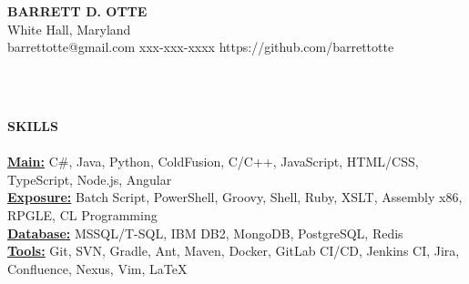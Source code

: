 \documentclass{article}
\newcommand{\lineunder}{
	\vspace*{-4pt}\\ 
	\hspace*{-18pt}\hrulefill \\
}
\newcommand{\header}[1]{
	{\hspace*{-15pt}\vspace*{6pt}\textsc{#1}}\vspace*{-6pt}\lineunder
}
\newcommand{\contact}[5]{
	\vspace*{-8pt}
	\begin{center}
		{\Large \textbf \scshape {#1}}\\
		\normalsize #2\\
		\normalsize #3 \hspace*{20pt} 
		\normalsize #4 \hspace*{20pt}
		\normalsize #5
		\lineunder
	\end{center}
	\vspace*{-8pt}
}
\newcommand{\resumeheader}[1]{
	\vspace*{5pt}
	\header{\textbf{#1}}
}
\begin{document}
	\normalsize
	\smallskip
	\vspace*{-44pt}

	\contact
		{\bfseries BARRETT D. OTTE}
		{White Hall, Maryland}
		{barrettotte@gmail.com}
		{xxx-xxx-xxxx}
		{https://github.com/barrettotte}
	
	\resumeheader{SKILLS}
		\textbf{\underline{Main:}} 
			C\#, Java, Python, ColdFusion, C/C++, JavaScript, HTML/CSS, TypeScript, Node.js, Angular \\ \vspace*{4pt}
		\textbf{\underline{Exposure:}} 
			Batch Script, PowerShell, Groovy, Shell, Ruby, XSLT, Assembly x86, RPGLE, CL Programming \\ \vspace*{4pt}
		\textbf{\underline{Database:}} 
			MSSQL/T-SQL, IBM DB2, MongoDB, PostgreSQL, Redis \\ \vspace*{4pt}
		\textbf{\underline{Tools:}} 
			Git, SVN, Gradle, Ant, Maven, Docker, GitLab CI/CD, Jenkins CI, Jira, Confluence, Nexus, Vim, LaTeX \\ \vspace*{4pt}
		
\end{document}
